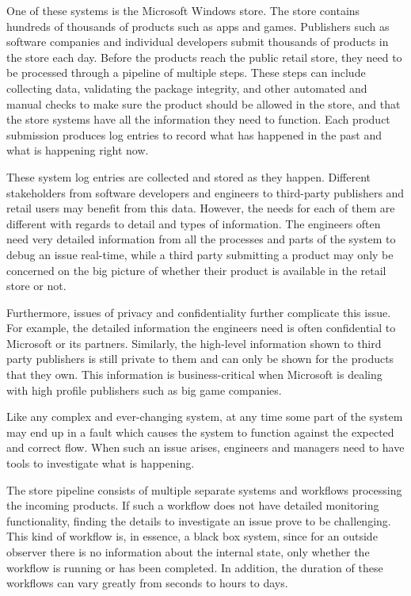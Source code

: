 \documentclass[english,12pt,a4paper,pdftex,sci,utf8]{aaltothesis}
\theoremstyle{definition}
\begin{document}
One of these systems is the Microsoft Windows store. The store contains hundreds of thousands of products
such as apps and games. Publishers such as software companies and individual developers submit thousands of 
products in the store each day. Before the products reach the public retail store, they need to be processed
through a pipeline of multiple steps. These steps can include collecting data, validating the package integrity, and
other automated and manual checks to make sure the product should be allowed in the store, 
and that the store systems have all the information they need to function.
Each product submission produces log entries to record what has happened in the past and what is happening right now.

These system log entries are collected and stored as they happen. 
Different stakeholders from software developers and engineers to third-party publishers and retail users 
may benefit from this data. However, the needs for each of them are
different with regards to detail and types of information.
The engineers often need very detailed information from all the processes and parts of the system to debug an issue real-time,
while a third party submitting a product may only be concerned on the big picture of whether their 
product is available in the retail store or not.

Furthermore, issues of privacy and confidentiality further complicate this issue.
For example, the detailed information the engineers need is often confidential to Microsoft or its partners.
Similarly, the high-level information shown to third party publishers is still private to them 
and can only be shown for the products that they own.
This information is business-critical when Microsoft is dealing with high profile publishers such as big game companies.

Like any complex and ever-changing system, at any time some part of the system may end up in a fault
which causes the system to function against the expected and correct flow.
When such an issue arises, engineers and managers need to have tools to investigate what is happening. 

The store pipeline consists of multiple separate systems and workflows processing the incoming products.
If such a workflow does not have detailed monitoring functionality, 
finding the details to investigate an issue prove to be challenging.
This kind of workflow is, in essence, a black box system, since for an outside observer there is no information
about the internal state, only whether the workflow is running or has been completed.
In addition, the duration of these workflows can vary greatly from seconds to hours to days. 
\end{document}
